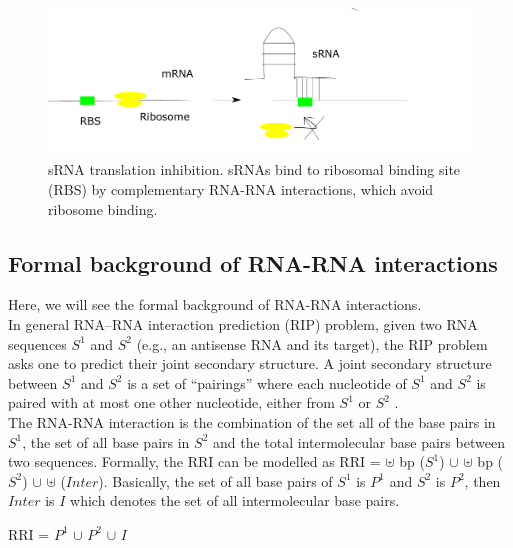\documentclass[twoside,a4paper]{report}
\numberwithin{equation}{section}
\begin{document}
 	
 	 \begin{figure}[tb]
 		\includegraphics[width=0.8\linewidth]{sRNA}
 		\centering
 		\caption{sRNA translation inhibition. sRNAs bind to ribosomal binding site (RBS) by complementary RNA-RNA interactions, which avoid ribosome binding.}
 		\label{fig:sRNA}
 	\end{figure}
 	
 	
 	\subsection{Formal background of RNA-RNA interactions}
 	Here, we will see the formal background of RNA-RNA interactions.\\
 	In general RNA–RNA interaction prediction (RIP) problem, given two RNA sequences $S^1$ and $S^2$ (e.g., an antisense RNA and its target), the RIP problem asks one to predict their joint secondary structure. A joint secondary structure between $S^1$ and $S^2$ is a set of “pairings” where each nucleotide of $S^1$ and $S^2$ is paired with at most one other nucleotide, either from $S^1$ or $S^2$ \citep{alkan2006rna}.  \\
 	
 	The RNA-RNA interaction is the combination of the set all of the base pairs in $S^1$, the set of all base pairs in $S^2$ and the total intermolecular base pairs between two sequences. Formally, the RRI can be modelled as RRI = $ \uplus $ bp ($S^1$) $ \cup $ $\uplus$ bp ($S^2$) $\cup$ $\uplus$ ($Inter$). Basically, the set of all base pairs of $S^1$ is $P^1$ and $S^2$ is $P^2$, then $Inter$ is $I$ which denotes the set of all intermolecular base pairs. \\
 	
 		\begin{center}
 		RRI =  $P^1$ $ \cup $  $P^2$ $\cup$ $I$
 		\end{center}
 	
\end{document}
